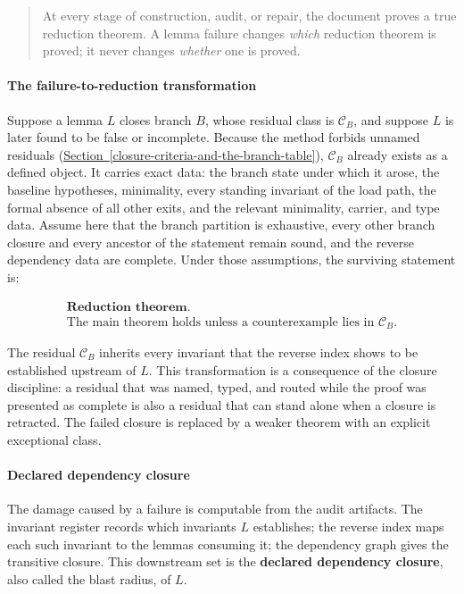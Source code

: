 \documentclass[
  11pt,
]{article}
\theoremstyle{definition}
\newcommand{\secref}[1]{\hyperref[#1]{Section~\ref*{#1}}}
\begin{document}
\begin{quote}
At every stage of construction, audit, or repair, the document proves a
true reduction theorem. A lemma failure changes \emph{which} reduction
theorem is proved; it never changes \emph{whether} one is proved.
\end{quote}

\paragraph{The failure-to-reduction
transformation}\label{the-failure-to-reduction-transformation}

Suppose a lemma \(L\) closes branch \(B\), whose residual class is
\(\mathcal C_B\), and suppose \(L\) is later found to be false or
incomplete. Because the method forbids unnamed residuals (\secref{closure-criteria-and-the-branch-table}),
\(\mathcal C_B\) already exists as a defined object. It carries exact
data: the branch state under which it arose, the baseline hypotheses,
minimality, every standing invariant of the load path, the formal
absence of all other exits, and the relevant minimality, carrier, and
type data. Assume here that the branch partition is exhaustive, every
other branch closure and every ancestor of the statement remain sound,
and the reverse dependency data are complete. Under those assumptions,
the surviving statement is:

\[
\begin{gathered}
\textbf{Reduction theorem.}\\
\text{The main theorem holds unless a counterexample lies in } \mathcal C_B.
\end{gathered}
\]

The residual \(\mathcal C_B\) inherits every invariant that the reverse
index shows to be established upstream of \(L\). This transformation is
a consequence of the closure discipline: a residual that was named,
typed, and routed while the proof was presented as complete is also a
residual that can stand alone when a closure is retracted. The failed
closure is replaced by a weaker theorem with an explicit exceptional
class.

\paragraph{Declared dependency closure}\label{bounded-blast-radius}

The damage caused by a failure is computable from the audit artifacts.
The invariant register records which invariants \(L\) establishes; the
reverse index maps each such invariant to the lemmas consuming it; the
dependency graph gives the transitive closure. This downstream set is
the \textbf{declared dependency closure}, also called the blast radius,
of \(L\).
\end{document}
